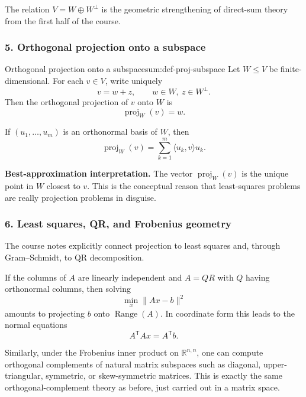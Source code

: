 The relation \(V=W\oplus W^\perp\) is the geometric strengthening of direct-sum theory from the first half of the course.

\subsubsection*{5. Orthogonal projection onto a subspace}

\begin{definition}{Orthogonal projection onto a subspace}{sum:def-proj-subspace}
Let \(W\le V\) be finite-dimensional. For each \(v\in V\), write uniquely
\[
v=w+z,\qquad w\in W,\ z\in W^\perp.
\]
Then the orthogonal projection of \(v\) onto \(W\) is
\[
\operatorname{proj}_W(v)=w.
\]
\end{definition}

\begin{keyformula}[title={Key Formula: projection using an orthonormal basis of \(W\)}]
If \((u_1,\dots,u_m)\) is an orthonormal basis of \(W\), then
\[
\operatorname{proj}_W(v)=\sum_{k=1}^m \langle u_k,v\rangle u_k.
\]
\end{keyformula}

\begin{policynote}
\textbf{Best-approximation interpretation.}
The vector \(\operatorname{proj}_W(v)\) is the unique point in \(W\) closest to \(v\). This is the conceptual reason that least-squares problems are really projection problems in disguise.
\end{policynote}

\subsubsection*{6. Least squares, QR, and Frobenius geometry}

The course notes explicitly connect projection to least squares and, through Gram--Schmidt, to QR decomposition.

If the columns of \(A\) are linearly independent and \(A=QR\) with \(Q\) having orthonormal columns, then solving
\[
\min_x \|Ax-b\|^2
\]
amounts to projecting \(b\) onto \(\operatorname{Range}(A)\). In coordinate form this leads to the normal equations
\[
A^{\mathsf T}Ax = A^{\mathsf T}b.
\]

Similarly, under the Frobenius inner product on \(\mathbb{R}^{n,n}\), one can compute orthogonal complements of natural matrix subspaces such as diagonal, upper-triangular, symmetric, or skew-symmetric matrices. This is exactly the same orthogonal-complement theory as before, just carried out in a matrix space.


